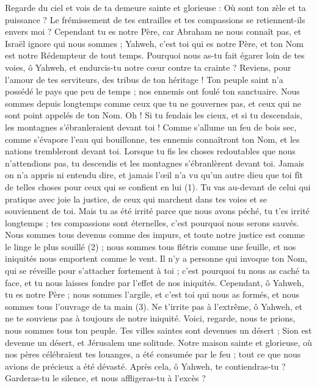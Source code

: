 \begin{multicols}{2}
Regarde du ciel et vois de ta demeure sainte et glorieuse : Où sont ton zèle et ta puissance ? Le frémissement de tes entrailles et tes compassions se retiennent-ils envers moi ?
Cependant tu es notre Père, car Abraham ne nous connaît pas, et Israël ignore qui nous sommes ; Yahweh, c'est toi qui es notre Père, et ton Nom est notre Rédempteur de tout temps.
Pourquoi nous as-tu fait égarer loin de tes voies, ô Yahweh, et endurcis-tu notre cœur contre ta crainte ? Reviens, pour l’amour de tes serviteurs, des tribus de ton héritage !
Ton peuple saint n’a possédé le pays que peu de temps ; nos ennemis ont foulé ton sanctuaire.
Nous sommes depuis longtemps comme ceux que tu ne gouvernes pas, et ceux qui ne sont point appelés de ton Nom. Oh ! Si tu fendais les cieux, et si tu descendais, les montagnes s’ébranleraient devant toi !
\VerseOne{}Comme s’allume un feu de bois sec, comme s’évapore l’eau qui bouillonne, tes ennemis connaîtront ton Nom, et les nations trembleront devant toi.
Lorsque tu fis les choses redoutables que nous n'attendions pas, tu descendis et les montagnes s’ébranlèrent devant toi.
Jamais on n’a appris ni entendu dire, et jamais l’œil n’a vu qu’un autre dieu que toi fît de telles choses pour ceux qui se confient en lui (1).
Tu vas au-devant de celui qui pratique avec joie la justice, de ceux qui marchent dans tes voies et se souviennent de toi. Mais tu as été irrité parce que nous avons péché, tu t’es irrité longtemps ; tes compassions sont éternelles, c'est pourquoi nous serons sauvés.
Nous sommes tous devenus comme des impurs, et toute notre justice est comme le linge le plus souillé (2) ; nous sommes tous flétris comme une feuille, et nos iniquités nous emportent comme le vent.
Il n'y a personne qui invoque ton Nom, qui se réveille pour s’attacher fortement à toi ; c'est pourquoi tu nous as caché ta face, et tu nous laisses fondre par l’effet de nos iniquités.
Cependant, ô Yahweh, tu es notre Père ; nous sommes l'argile, et c’est toi qui nous as formés, et nous sommes tous l'ouvrage de ta main (3).
Ne t’irrite pas à l’extrême, ô Yahweh, et ne te souviens pas à toujours de notre iniquité. Voici, regarde, nous te prions, nous sommes tous ton peuple.
Tes villes saintes sont devenues un désert ; Sion est devenue un désert, et Jérusalem une solitude.
Notre maison sainte et glorieuse, où nos pères célébraient tes louanges, a été consumée par le feu ; tout ce que nous avions de précieux a été dévasté.
Après cela, ô Yahweh, te contiendras-tu ? Garderas-tu le silence, et nous affligeras-tu à l’excès ?

\end{multicols}
